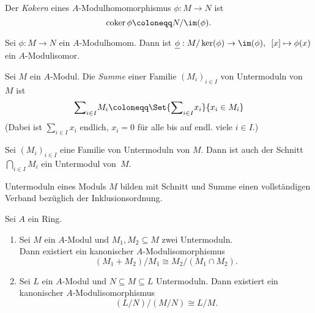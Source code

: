 \documentclass{cheat-sheet}
\DeclareMathOperator{\coker}{coker} %
\begin{document}
\begin{defn}
  Der \emph{Kokern} eines $A$-Modulhomomorphismus $\phi : M \to N$ ist
  \[
    \coker \phi \coloneqq N/\im(\phi).
  \]
\end{defn}


\begin{bem}
   \quad
  \inlineitem{$\phi$ surjektiv $\iff$ $\coker \phi = 0$}
\end{bem}

\begin{prop}
  Sei $\phi : M \to N$ ein $A$-Modulhomom.
  Dann ist $\underline{\phi} : M / \ker(\phi) \to \im(\phi), \enspace [x] \mapsto \phi(x)$ ein $A$-Modulisomor.
\end{prop}


\begin{defn}
  Sei $M$ ein $A$-Modul.
  Die \emph{Summe} einer Familie $(M_i)_{i \in I}$ von Untermoduln von $M$ ist
  \[
    {\sum}_{i \in I} M_i \coloneqq \Set{{\sum}_{i \in I} x_i}{x_i \in M_i}
  \]
  (Dabei ist $\sum_{i \in I} x_i$ endlich, \dh{} $x_i = 0$ für alle bis auf endl. viele $i \in I$.)
\end{defn}

\begin{prop}
  Sei $(M_i)_{i \in I}$ eine Familie von Untermoduln von $M$.
  Dann ist auch der Schnitt ${\bigcap}_{i \in I} M_i$ ein Untermodul von~$M$.
\end{prop}

\begin{bem}
  Untermoduln eines Moduls $M$ bilden mit Schnitt und Summe einen vollständigen Verband bezüglich der Inklusionsordnung.
\end{bem}


\begin{prop}
  Sei $A$ ein Ring.
  \begin{enumerate}
    \item Sei $M$ ein $A$-Modul und $M_1, M_2 \subseteq M$ zwei Untermoduln. \\
    Dann existiert ein kanonischer $A$-Modulisomorphismus
    \[
      (M_1 + M_2)/M_1 \cong M_2 / (M_1 \cap M_2).
    \]
    \item Sei $L$ ein $A$-Modul und $N \subseteq M \subseteq L$ Untermoduln.
    Dann existiert ein kanonischer $A$-Modulisomorphismus
    \[
      (L/N) / (M/N) \cong L/M.
    \]
  \end{enumerate}
\end{prop}
\end{document}
